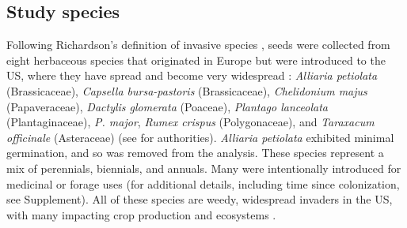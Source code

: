 \documentclass[11pt]{article}\usepackage[]{graphicx}\usepackage[]{color}
\begin{document}
	\subsection{Study species}
	Following Richardson's definition of invasive species \parencite[][, see Supplement for details]{Richardson2000, Richardson2011}, seeds were collected from eight herbaceous species that originated in Europe but were introduced to the US, where they have spread and become very widespread \parencite{Uva1997}:\textit{ Alliaria petiolata} (Brassicaceae), \textit{Capsella bursa-pastoris} (Brassicaceae), \textit{Chelidonium majus} (Papaveraceae), \textit{Dactylis glomerata} (Poaceae), \textit{Plantago lanceolata} (Plantaginaceae), \textit{P. major}, \textit{Rumex crispus} (Polygonaceae), and \textit{Taraxacum officinale} (Asteraceae) (see \textcite{Haines2011} for authorities). \textit{Alliaria petiolata} exhibited minimal germination, and so was removed from the analysis. These species represent a mix of perennials, biennials, and annuals. Many were intentionally introduced for medicinal or forage uses (for additional details, including time since colonization, see Supplement). All of these species are weedy, widespread invaders in the US, with many impacting crop production and ecosystems \parencite[e.g.,][]{Froese2003,Wolfe2008}. 
\end{document}
